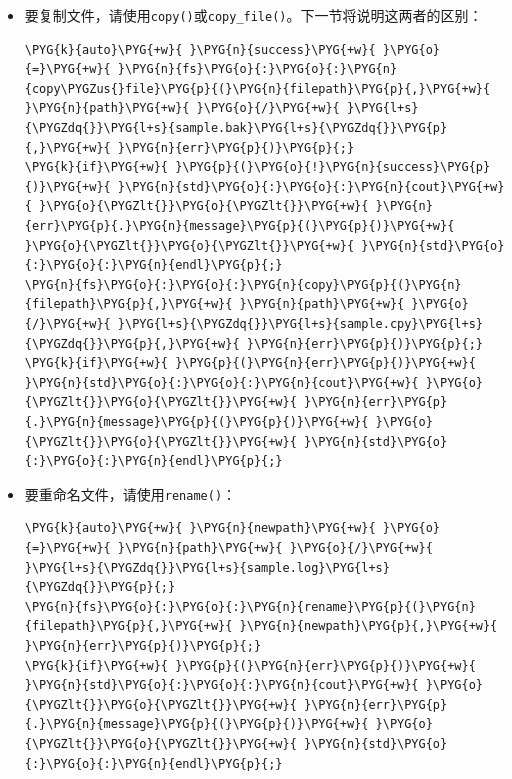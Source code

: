 \begin{itemize}
\item 要复制文件，请使用\texttt{copy()}或\texttt{copy\_\allowbreak{}file()}。下一节将说明这两者的区别：



\begin{codeblockbg}
\begin{Verbatim}[commandchars=\\\{\},breaklines=true,breakanywhere=true,fontsize=\codefont,xleftmargin=17bp]
\PYG{k}{auto}\PYG{+w}{ }\PYG{n}{success}\PYG{+w}{ }\PYG{o}{=}\PYG{+w}{ }\PYG{n}{fs}\PYG{o}{:}\PYG{o}{:}\PYG{n}{copy\PYGZus{}file}\PYG{p}{(}\PYG{n}{filepath}\PYG{p}{,}\PYG{+w}{ }\PYG{n}{path}\PYG{+w}{ }\PYG{o}{/}\PYG{+w}{ }\PYG{l+s}{\PYGZdq{}}\PYG{l+s}{sample.bak}\PYG{l+s}{\PYGZdq{}}\PYG{p}{,}\PYG{+w}{ }\PYG{n}{err}\PYG{p}{)}\PYG{p}{;}
\PYG{k}{if}\PYG{+w}{ }\PYG{p}{(}\PYG{o}{!}\PYG{n}{success}\PYG{p}{)}\PYG{+w}{ }\PYG{n}{std}\PYG{o}{:}\PYG{o}{:}\PYG{n}{cout}\PYG{+w}{ }\PYG{o}{\PYGZlt{}}\PYG{o}{\PYGZlt{}}\PYG{+w}{ }\PYG{n}{err}\PYG{p}{.}\PYG{n}{message}\PYG{p}{(}\PYG{p}{)}\PYG{+w}{ }\PYG{o}{\PYGZlt{}}\PYG{o}{\PYGZlt{}}\PYG{+w}{ }\PYG{n}{std}\PYG{o}{:}\PYG{o}{:}\PYG{n}{endl}\PYG{p}{;}
\PYG{n}{fs}\PYG{o}{:}\PYG{o}{:}\PYG{n}{copy}\PYG{p}{(}\PYG{n}{filepath}\PYG{p}{,}\PYG{+w}{ }\PYG{n}{path}\PYG{+w}{ }\PYG{o}{/}\PYG{+w}{ }\PYG{l+s}{\PYGZdq{}}\PYG{l+s}{sample.cpy}\PYG{l+s}{\PYGZdq{}}\PYG{p}{,}\PYG{+w}{ }\PYG{n}{err}\PYG{p}{)}\PYG{p}{;}
\PYG{k}{if}\PYG{+w}{ }\PYG{p}{(}\PYG{n}{err}\PYG{p}{)}\PYG{+w}{ }\PYG{n}{std}\PYG{o}{:}\PYG{o}{:}\PYG{n}{cout}\PYG{+w}{ }\PYG{o}{\PYGZlt{}}\PYG{o}{\PYGZlt{}}\PYG{+w}{ }\PYG{n}{err}\PYG{p}{.}\PYG{n}{message}\PYG{p}{(}\PYG{p}{)}\PYG{+w}{ }\PYG{o}{\PYGZlt{}}\PYG{o}{\PYGZlt{}}\PYG{+w}{ }\PYG{n}{std}\PYG{o}{:}\PYG{o}{:}\PYG{n}{endl}\PYG{p}{;}
\end{Verbatim}
\end{codeblockbg}



\item 要重命名文件，请使用\texttt{rename()}：



\begin{codeblockbg}
\begin{Verbatim}[commandchars=\\\{\},breaklines=true,breakanywhere=true,fontsize=\codefont,xleftmargin=17bp]
\PYG{k}{auto}\PYG{+w}{ }\PYG{n}{newpath}\PYG{+w}{ }\PYG{o}{=}\PYG{+w}{ }\PYG{n}{path}\PYG{+w}{ }\PYG{o}{/}\PYG{+w}{ }\PYG{l+s}{\PYGZdq{}}\PYG{l+s}{sample.log}\PYG{l+s}{\PYGZdq{}}\PYG{p}{;}
\PYG{n}{fs}\PYG{o}{:}\PYG{o}{:}\PYG{n}{rename}\PYG{p}{(}\PYG{n}{filepath}\PYG{p}{,}\PYG{+w}{ }\PYG{n}{newpath}\PYG{p}{,}\PYG{+w}{ }\PYG{n}{err}\PYG{p}{)}\PYG{p}{;}
\PYG{k}{if}\PYG{+w}{ }\PYG{p}{(}\PYG{n}{err}\PYG{p}{)}\PYG{+w}{ }\PYG{n}{std}\PYG{o}{:}\PYG{o}{:}\PYG{n}{cout}\PYG{+w}{ }\PYG{o}{\PYGZlt{}}\PYG{o}{\PYGZlt{}}\PYG{+w}{ }\PYG{n}{err}\PYG{p}{.}\PYG{n}{message}\PYG{p}{(}\PYG{p}{)}\PYG{+w}{ }\PYG{o}{\PYGZlt{}}\PYG{o}{\PYGZlt{}}\PYG{+w}{ }\PYG{n}{std}\PYG{o}{:}\PYG{o}{:}\PYG{n}{endl}\PYG{p}{;}
\end{Verbatim}
\end{codeblockbg}



\end{itemize}
